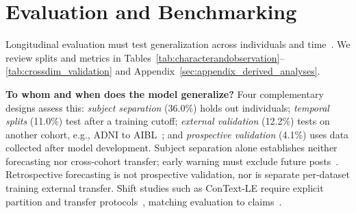 \documentclass[11pt]{article}
\theoremstyle{plain}
\theoremstyle{definition}
\theoremstyle{remark}
\begin{document}


\section{Evaluation and Benchmarking}
\label{sec:evaluation}
Longitudinal evaluation must test generalization across individuals and time~\cite{tsakalidis-etal-2022-identifying}. We review splits and metrics in Tables~\ref{tab:characterandobservation}--\ref{tab:crossdim_validation} and Appendix~\ref{sec:appendix_derived_analyses}.

\noindent\textbf{To whom and when does the model generalize?}
Four complementary designs assess this: \emph{subject separation} (36.0\%) holds out individuals; \emph{temporal splits} (11.0\%) test after a training cutoff; \emph{external validation} (12.2\%) tests on another cohort, e.g., ADNI to AIBL~\citep{10483639}; and \emph{prospective validation} (4.1\%) uses data collected after model development. Subject separation alone establishes neither forecasting nor cross-cohort transfer; early warning must exclude future posts~\citep{tsakalidis-etal-2022-identifying}. Retrospective forecasting is not prospective validation, nor is separate per-dataset training external transfer. Shift studies such as ConText-LE require explicit partition and transfer protocols~\citep{hayat-etal-2025-context}, matching evaluation to claims~\cite{lazaridou2021mindgapassessingtemporal,piryani2025itshightimesurvey}.
\end{document}
